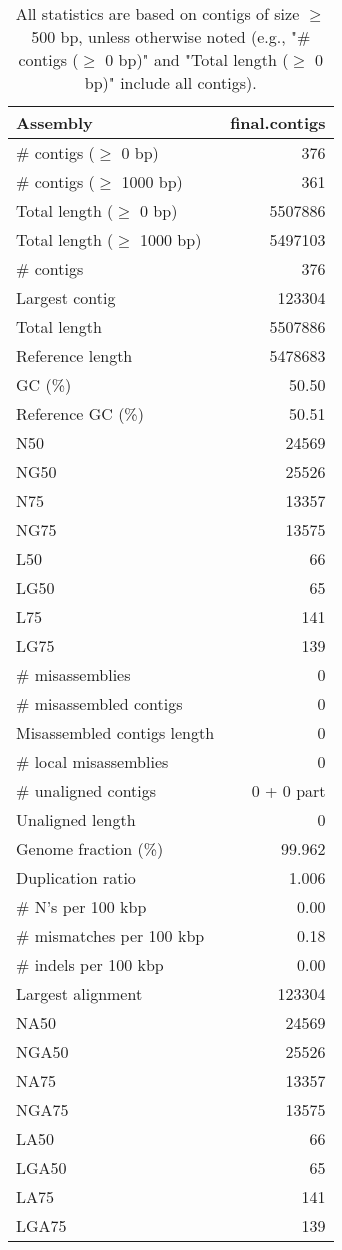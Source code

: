 \documentclass[12pt,a4paper]{article}
\begin{document}
\begin{table}[ht]
\begin{center}
\caption{All statistics are based on contigs of size $\geq$ 500 bp, unless otherwise noted (e.g., "\# contigs ($\geq$ 0 bp)" and "Total length ($\geq$ 0 bp)" include all contigs).}
\begin{tabular}{|l*{1}{|r}|}
\hline
Assembly & final.contigs \\ \hline
\# contigs ($\geq$ 0 bp) & 376 \\ \hline
\# contigs ($\geq$ 1000 bp) & 361 \\ \hline
Total length ($\geq$ 0 bp) & 5507886 \\ \hline
Total length ($\geq$ 1000 bp) & 5497103 \\ \hline
\# contigs & 376 \\ \hline
Largest contig & 123304 \\ \hline
Total length & 5507886 \\ \hline
Reference length & 5478683 \\ \hline
GC (\%) & 50.50 \\ \hline
Reference GC (\%) & 50.51 \\ \hline
N50 & 24569 \\ \hline
NG50 & 25526 \\ \hline
N75 & 13357 \\ \hline
NG75 & 13575 \\ \hline
L50 & 66 \\ \hline
LG50 & 65 \\ \hline
L75 & 141 \\ \hline
LG75 & 139 \\ \hline
\# misassemblies & 0 \\ \hline
\# misassembled contigs & 0 \\ \hline
Misassembled contigs length & 0 \\ \hline
\# local misassemblies & 0 \\ \hline
\# unaligned contigs & 0 + 0 part \\ \hline
Unaligned length & 0 \\ \hline
Genome fraction (\%) & 99.962 \\ \hline
Duplication ratio & 1.006 \\ \hline
\# N's per 100 kbp & 0.00 \\ \hline
\# mismatches per 100 kbp & 0.18 \\ \hline
\# indels per 100 kbp & 0.00 \\ \hline
Largest alignment & 123304 \\ \hline
NA50 & 24569 \\ \hline
NGA50 & 25526 \\ \hline
NA75 & 13357 \\ \hline
NGA75 & 13575 \\ \hline
LA50 & 66 \\ \hline
LGA50 & 65 \\ \hline
LA75 & 141 \\ \hline
LGA75 & 139 \\ \hline
\end{tabular}
\end{center}
\end{table}
\end{document}
